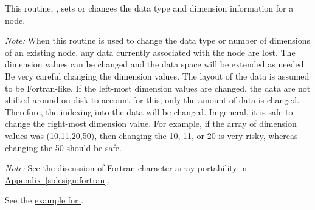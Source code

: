 This routine, , sets or changes
the data type and dimension information for a node.

\noindent
\emph{Note:}
When this routine is used to change the data type or number of
dimensions of an existing node, any data currently associated with the
node are lost.
The dimension values can be changed and the data space will be extended
as needed.
Be very careful changing the dimension values.
The layout of the data is assumed to be Fortran-like.
If the left-most dimension values are changed, the data are not shifted
around on disk to account for this; only the amount of data is changed.
Therefore, the indexing into the data will be changed.
In general, it is safe to change the right-most dimension value.
For example, if the array of dimension values was (10,11,20,50), then
changing the 10, 11, or 20 is very risky, whereas changing the 50 should
be safe.

\noindent
\emph{Note:}
See the discussion of Fortran character array portability in
\hyperref[s:design:fortran]{Appendix~\ref*{s:design:fortran}}.

\Example

See the \hyperlink{ex:Get\_Data\_Type}{example for }.
